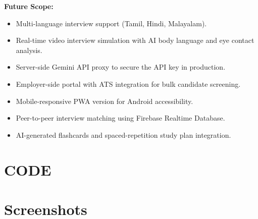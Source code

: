 \documentclass{fisatprojectfinal}
\begin{document}
\noindent\textbf{Future Scope:}
\begin{itemize}
  \item Multi-language interview support (Tamil, Hindi, Malayalam).
  \item Real-time video interview simulation with AI body language and eye contact analysis.
  \item Server-side Gemini API proxy to secure the API key in production.
  \item Employer-side portal with ATS integration for bulk candidate screening.
  \item Mobile-responsive PWA version for Android accessibility.
  \item Peer-to-peer interview matching using Firebase Realtime Database.
  \item AI-generated flashcards and spaced-repetition study plan integration.
\end{itemize}

\renewcommand\bibname{References}
{\thispagestyle{empty}}

\thispagestyle{empty}

\newpage
{}
\begin{appendices}
\chapter{CODE}
\chapter{Screenshots}
\end{appendices}
\end{document}
